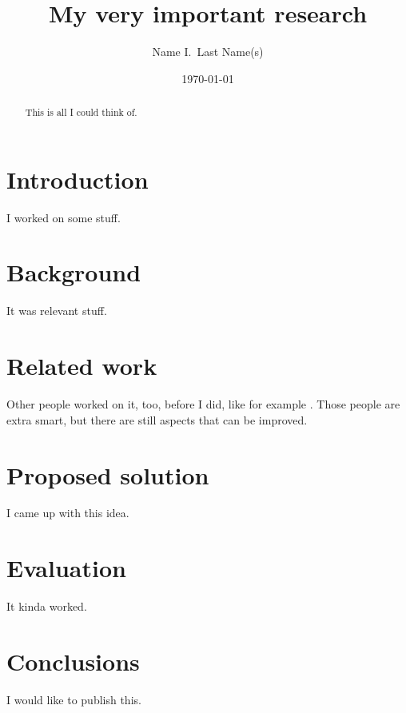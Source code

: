 \documentclass{elsarticle}
\begin{document}
\author{Name I.\ {Last Name(s)}}
\date{\today}

\title{My very important research}

\begin{abstract}
  This is all I could think of.
\end{abstract}

\maketitle

\section{Introduction}

I worked on some stuff.

\section{Background}

It was relevant stuff. 

\section{Related work}

Other people worked on it, too, before I did, like for example
\citet{elisa}. Those people are extra smart, but there are still
aspects that can be improved.

\section{Proposed solution}

I came up with this idea.

\section{Evaluation}

It kinda worked.

\section{Conclusions}

I would like to publish this.



\end{document}
